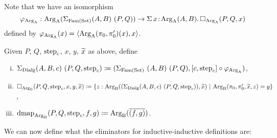 \documentclass[orivec,envcountsame, ,envcountsect]{llncs}
\begin{document}
\noindent Note that we have an isomorphism
\[
\varphi_{\text{Arg}_{\text{A}}} : \text{Arg}_{\text{A}}(\Sigma_{\text{Fam}(\text{Set})} (A, B)\ (P, Q)) \to \Sigma\,x\!:\! \text{Arg}_{\text{A}}(A, B) .\, \Box_{\text{Arg}_{\text{A}}}(P, Q, x)
\]
defined by $\varphi_{\text{Arg}_{\text{A}}}(x) = \langle \text{Arg}_{\text{A}}(\pi_0, \pi'_0)(x), x\rangle$.

\begin{definition}
Given $P$, $Q$, $\text{step}_{c}$, $x$, $y$, $\widetilde{x}$ as above, define
  \begin{enumerate}[(i)]
  \item $\Sigma_{\text{Dialg}} (A, B, c)\ (P, Q, \text{step}_{c}) \coloneqq (\Sigma_{\text{Fam}(\text{Set})}\ (A,
    B)\ (P, Q), [c, \text{step}_{c}] \circ \varphi_{\text{Arg}_{\text{A}}})$,
  \item $\Box_{\text{Arg}_{\text{B}}}(P, Q, \text{step}_{c}, x, y, \widetilde{x}) \coloneqq \\
\{ z : \text{Arg}_{\text{B}}((\Sigma_{\text{Dialg}} (A, B, c)\ (P, Q, \text{step}_{c})), \widetilde{x}
)\ |\ \text{Arg}_{\text{B}}(\pi_0, \pi'_0, \widetilde{x}, z) = y \}$,
\item $\text{dmap}_{\text{Arg}_{\text{B}}}(P, Q, \text{step}_{c}, f, g) \coloneqq \text{Arg}_{\text{B}}(\overline{(f, g)})$.
  \end{enumerate}
\end{definition}
We can now define what the eliminators for inductive-inductive definitions are:
\end{document}
